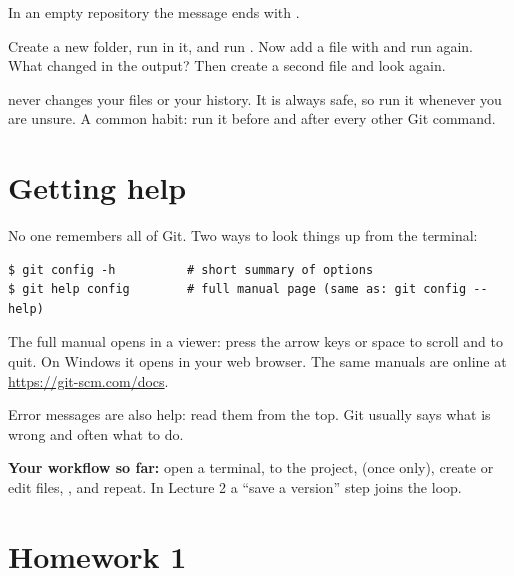 In an empty repository the message ends with .

\begin{tryit}
Create a new folder, run  in it, and run . Now add a file with  and run  again. What changed in the output? Then create a second file and look again.
\end{tryit}

\begin{keyidea}
 never changes your files or your history. It is always safe, so run it whenever you are unsure. A common habit: run it before and after every other Git command.
\end{keyidea}

\section{Getting help}

No one remembers all of Git. Two ways to look things up from the terminal:

\begin{lstlisting}
$ git config -h          # short summary of options
$ git help config        # full manual page (same as: git config --help)
\end{lstlisting}
The full manual opens in a viewer: press the arrow keys or space to scroll and  to quit. On Windows it opens in your web browser. The same manuals are online at \url{https://git-scm.com/docs}.

Error messages are also help: read them from the top. Git usually says what is wrong and often what to do.

\textbf{Your workflow so far:} open a terminal,  to the project,  (once only), create or edit files, , and repeat. In Lecture 2 a ``save a version'' step joins the loop.


\section{Homework 1}

